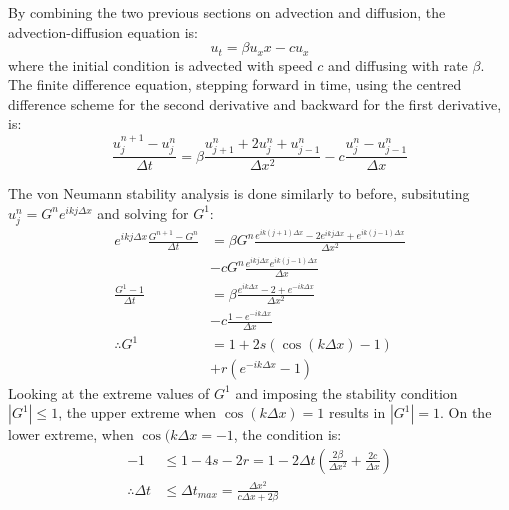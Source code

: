 \documentclass[twocolumn]{article}
\begin{document}
By combining the two previous sections on advection and diffusion, the
advection-diffusion equation is:
\begin{equation}
  u_t = \beta u_xx - c u_x
\end{equation}
where the initial condition is advected with speed $c$ and diffusing
with rate $\beta$. The finite difference equation, stepping forward in
time, using the centred difference scheme for the second derivative
and backward for the first derivative, is:
\begin{equation}
  \frac{u_j^{n+1} - u_j^n}{\Delta t} = \beta \frac{u_{j+1}^n + 2 u_j^n
    + u_{j-1}^n}{\Delta x^2} - c \frac{u_j^n - u_{j-1}^n}{\Delta x}
\end{equation}

The von Neumann stability analysis is done similarly to before,
subsituting $u_j^n = G^n e^{i k j \Delta x}$ and solving for $G^1$:
\begin{equation}
  \begin{aligned}
    e^{i k j \Delta x} \frac{G^{n+1} - G^n}{\Delta t} &=
    \beta G^n \frac{e^{i k (j + 1) \Delta x} - 2 e^{i k j \Delta x}
      + e^{i k (j - 1) \Delta x}}{\Delta x^2} \\
    &- c G^n \frac{e^{i k j \Delta x}
      e^{i k (j - 1) \Delta x}}{\Delta x} \\
    \frac{G^1 - 1}{\Delta t} &= \beta \frac{e^{i k \Delta x} - 2 +
      e^{- i k \Delta x}}{\Delta x^2} \\
    &- c \frac{1 - e^{- i k \Delta
        x}}{\Delta x} \\
    \therefore G^1 &= 1 + 2 s \left( \cos(k \Delta x) - 1 \right) \\
    &+ r \left(e^{-i k \Delta x} - 1 \right)
  \end{aligned}
\end{equation}
Looking at the extreme values of $G^1$ and imposing the stability
condition $|G^1| \leq 1$, the upper extreme when $\cos(k \Delta x) =
1$ results in $|G^1| = 1$. On the lower extreme, when $\cos(k \Delta x
= -1$, the condition is:
\begin{equation}
  \begin{aligned}
    -1 &\leq 1 - 4s - 2r =1 - 2 \Delta t \left( \frac{2 \beta}{\Delta
        x^2} + \frac{2 c}{\Delta x} \right) \\
    \therefore \Delta t &\leq \Delta t_{max} = \frac{\Delta x^2}{c
      \Delta x + 2 \beta}
  \end{aligned}
\end{equation}
\end{document}
